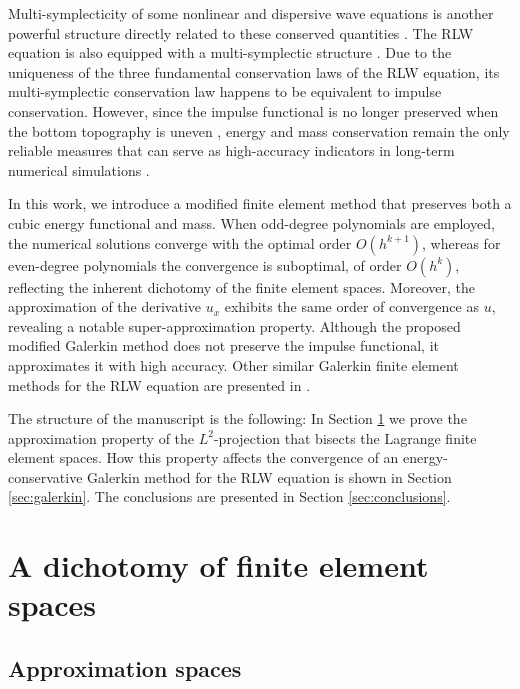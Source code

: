 \documentclass{amsart}
\begin{document}
Multi-symplecticity of some nonlinear and dispersive wave equations is another powerful structure directly related to these conserved quantities \cite{DDM2019i,DDM2019ii}. The RLW equation is also equipped with a multi-symplectic structure \cite{CWG1991,SQ2004,Cai2009,Cai2009b}. Due to the uniqueness of the three fundamental conservation laws of the RLW equation, its multi-symplectic conservation law happens to be equivalent to impulse conservation. However, since the impulse functional is no longer preserved when the bottom topography is uneven \cite{I2010,AM2025}, energy and mass conservation remain the only reliable measures that can serve as high-accuracy indicators in long-term numerical simulations \cite{IKKM2021,AM2025,AK2014,KKM2016}. 

In this work, we introduce a modified finite element method that preserves both a cubic energy functional and mass. When odd-degree polynomials are employed, the numerical solutions converge with the optimal order $O(h^{k+1})$, whereas for even-degree polynomials the convergence is suboptimal, of order $O(h^k)$, reflecting the inherent dichotomy of the finite element spaces. Moreover, the approximation of the derivative $u_x$ exhibits the same order of convergence as $u$, revealing a notable super-approximation property. Although the proposed modified Galerkin method does not preserve the impulse functional, it approximates it with high accuracy. Other similar Galerkin finite element methods for the RLW equation are presented in \cite{GH2006}.


The structure of the manuscript is the following: In Section \ref{sec:dichotomy} we prove the approximation property of the $L^2$-projection that bisects the Lagrange finite element spaces.  How this property affects the convergence of an energy-conservative Galerkin method for the RLW equation is shown in Section \ref{sec:galerkin}. The conclusions are presented in Section \ref{sec:conclusions}. 



\section{A dichotomy of finite element spaces}\label{sec:dichotomy}

\subsection{Approximation spaces}
\end{document}
